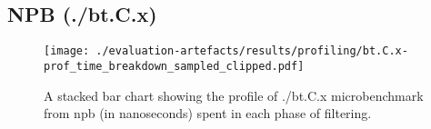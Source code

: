 \subsection{NPB (./bt.C.x)}
\begin{figure}[H]
    \centering
    \texttt{[image: ./evaluation-artefacts/results/profiling/bt.C.x-prof\_time\_breakdown\_sampled\_clipped.pdf]}
    \caption{A stacked bar chart showing the profile of ./bt.C.x microbenchmark
      from \ac{npb} (in nanoseconds) \af
    spent in each phase of filtering.}
    \label{fig:npb-profile}
\end{figure}

